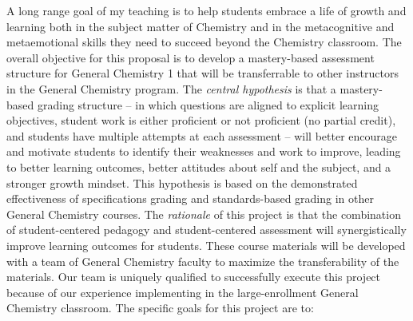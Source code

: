 \documentclass[10pt,letterpaper]{article}
\begin{document}
A long range goal of my teaching is to help students embrace a life of growth and learning both in the subject matter of Chemistry and in the metacognitive and metaemotional skills they need to succeed beyond the Chemistry classroom.
%
The overall objective for this proposal is to develop a mastery-based assessment structure for General Chemistry 1 that will be transferrable to other instructors in the General Chemistry program. 
The \textit{central hypothesis} is that a mastery-based grading structure -- in which questions are aligned to explicit learning objectives, student work is either proficient or not proficient (no partial credit), and students have multiple attempts at each assessment -- will better encourage and motivate students to identify their weaknesses and work to improve, leading to
better learning outcomes, better attitudes about self and the subject, and a stronger growth mindset.
%
This hypothesis is based on the demonstrated effectiveness of specifications grading and standards-based grading in other General Chemistry courses.\cite{toledo2016,toledo2017,Boesdorfer2018,Martin2019}
The \textit{rationale} of this project is that the combination of student-centered pedagogy  and student-centered assessment will synergistically improve learning outcomes for students.  These course materials will be developed with a team of General Chemistry faculty to maximize the transferability of the materials. 
Our team is uniquely qualified to successfully execute this project because of our experience implementing \pogil in the large-enrollment General Chemistry classroom. The specific goals for this project are to:
\end{document}
